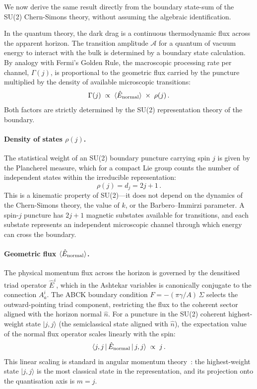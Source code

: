\documentclass[aps,prd,twocolumn,10pt,superscriptaddress,nofootinbib]{revtex4-2}
\begin{document}
We now derive the same result directly from the boundary state-sum
of the SU(2) Chern-Simons theory, without assuming the algebraic
identification.

In the quantum theory, the dark drag is a continuous thermodynamic
flux across the apparent horizon.  The transition amplitude
$\mathcal{A}$ for a quantum of vacuum energy to interact with the
bulk is determined by a boundary state calculation.  By analogy
with Fermi's Golden Rule, the macroscopic processing rate per
channel, $\Gamma(j)$, is proportional to the geometric flux
carried by the puncture multiplied by the density of available
microscopic transitions:
\begin{equation}
\Gamma(j) \;\propto\;
  \langle \hat{E}_{\rm normal} \rangle
  \;\times\; \rho(j)\,.
\label{eq:Gamma_j}
\end{equation}
Both factors are strictly determined by the SU(2) representation
theory of the boundary.

\paragraph{Density of states $\rho(j)$.}

The statistical weight of an SU(2) boundary puncture carrying
spin $j$ is given by the Plancherel measure, which for a compact
Lie group counts the number of independent states within the
irreducible representation:
\begin{equation}
\rho(j) = d_j = 2j + 1\,.
\label{eq:plancherel}
\end{equation}
This is a kinematic property of SU(2)---it does not depend on the
dynamics of the Chern-Simons theory, the value of $k$, or the
Barbero--Immirzi parameter.  A spin-$j$ puncture has $2j+1$
magnetic substates available for transitions, and each substate
represents an independent microscopic channel through which energy
can cross the boundary.

\paragraph{Geometric flux $\langle \hat{E}_{\rm normal} \rangle$.}

The physical momentum flux across the horizon is governed by the
densitised triad operator $\hat{E}^i$, which in the Ashtekar
variables is canonically conjugate to the connection $A_a^i$.  The
ABCK boundary condition
$F = -(\pi\gamma/A)\,\Sigma$ selects the outward-pointing triad
component, restricting the flux to the coherent sector aligned with
the horizon normal $\hat{n}$.  For a puncture in the SU(2) coherent
highest-weight state $|j, j\rangle$ (the semiclassical state
aligned with $\hat{n}$), the expectation value of the normal flux
operator scales linearly with the spin:
\begin{equation}
\langle j, j \,|\, \hat{E}_{\rm normal} \,|\, j, j \rangle
  \;\propto\; j\,.
\label{eq:flux_j}
\end{equation}
This linear scaling is standard in angular momentum
theory~\cite{Hall2015}: the highest-weight state $|j, j\rangle$
is the most classical state in the representation, and its
projection onto the quantisation axis is $m = j$.
\end{document}
